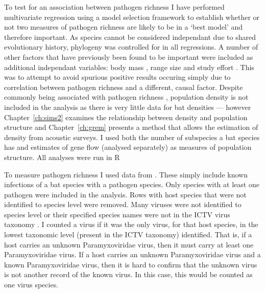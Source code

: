 To test for an association between pathogen richness I have performed multivariate regression using a model selection framework to establish whether or not two measures of pathogen richness are likely to be in a `best model' and therefore important.
As species cannot be considered independant due to shared evolutionary history, phylogeny was controlled for in all regressions.
A number of other factors that have previously been found to be important were included as additional independant variables: body mass \cite{kamiya2014determines, turmelle2009correlates, gay2014parasite, maganga2014bat}, range size \cite{kamiya2014determines, turmelle2009correlates, maganga2014bat} and study effort \cite{turmelle2009correlates, gay2014parasite, maganga2014bat}.
This was to attempt to avoid spurious positive results occuring simply due to correlation between pathogen richness and a different, causal factor.
Despite commonly being associated with pathogen richness \cite{arneberg2002host, kamiya2014determines, nunn2003comparative}, population density is not included in the analysis as there is very little data for bat densities --- however Chapter~\ref{ch:sims2} examines the relationship between density and population structure and Chapter~\ref{ch:grem} presents a method that allows the estimation of density from acoustic surveys.
I used both the number of subspecies a bat species has and estimates of gene flow (analysed separately) as measures of population structure.
All analyses were run in R \cite{R}

To measure pathogen richness I used data from \cite{luis2013comparison}. 
These simply include known infections of a bat species with a pathogen species. 
Only species with at least one pathogen were included in the analysis.
Rows with host species that were not identified to species level were removed.
Many viruses were not identified to species level or their specified species names were not in the ICTV virus taxonomy \cite{ICTV}.
I counted a virus if it was the only virus, for that host species, in the lowest taxonomic level (present in the ICTV taxonomy) identified.
That is, if a host carries an unknown Paramyxoviridae virus, then it must carry at least one Paramyxoviridae virus.
If a host carries an unknown Paramyxoviridae virus and a known Paramyxoviridae virus, then it is hard to confirm that the unknown virus is not another record of the known virus.
In this case, this would be counted as one virus species.






